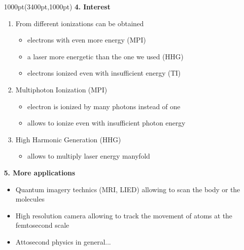 \documentclass[12pt]{beamer}
\begin{document}
\begin{frame}
\begin{textblock*}{1000pt}(3400pt,1000pt)
{\huge\textbf {4. Interest}} \\\vspace{30pt}
%
%
\begin{enumerate}
\Large
\item From different ionizations can be obtained
\begin{itemize}
\large
\item[$\bullet$] electrons with even more energy (MPI)
\item[$\bullet$] a laser more energetic than the one we used (HHG)
\item[$\bullet$] electrons ionized even with insufficient energy (TI)
\end{itemize}
\vspace{50pt}
\item Multiphoton Ionization (MPI)
\begin{itemize}
\large
\item[$\bullet$] electron is ionized by many photons instead of one
\item[$\bullet$] allows to ionize even with insufficient photon energy
\end{itemize}
\vspace{50pt}
\item High Harmonic Generation (HHG)
\begin{itemize}
\large
\item[$\bullet$] allows to multiply laser energy manyfold
\end{itemize}
\end{enumerate}
\vspace{100pt}
{\huge\textbf {5. More applications}} \\\vspace{30pt}
\begin{itemize}
\large
\item Quantum imagery technics (MRI, LIED) allowing to scan 
the body or the molecules
\item High resolution camera allowing to track the movement of atoms 
at the femtosecond scale
\item Attosecond physics in general...
\end{itemize}



\end{textblock*}


\end{frame}
\end{document}
